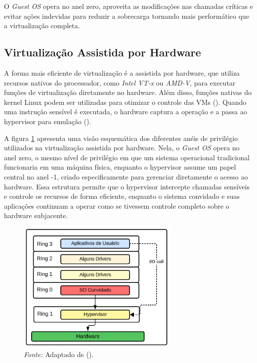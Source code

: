 O \textit{Guest OS} opera no anel zero, aproveita as modificações nas chamadas críticas e evitar ações indevidas para reduzir a sobrecarga tornando mais performático que a virtualização completa.

\subsection{Virtualização Assistida por Hardware}

A forma mais eficiente de virtualização é a assistida por hardware, que utiliza recursos nativos do processador, como \textit{Intel VT-x} ou \textit{AMD-V}, para executar funções de virtualização diretamente no hardware. Além disso, funções nativas do kernel Linux podem ser utilizadas para otimizar o controle das VMs (\cite{chirammal2016mastering}). Quando uma instrução sensível é executada, o hardware captura a operação e a passa ao hypervisor para emulação (\cite{modernOS}).

A figura \ref{fig:hardware_assisted_rings} apresenta uma visão esquemática dos diferentes anéis de privilégio utilizados na virtualização assistida por hardware. Nela, o \textit{Guest OS} opera no anel zero, o mesmo nível de privilégio em que um sistema operacional tradicional funcionaria em uma máquina física, enquanto o hypervisor assume um papel central no anel -1, criado especificamente para gerenciar diretamente o acesso ao hardware. Essa estrutura permite que o hypervisor intercepte chamadas sensíveis e controle os recursos de forma eficiente, enquanto o sistema convidado e suas aplicações continuam a operar como se tivessem controle completo sobre o hardware subjacente.

\begin{figure}[htbp]
  \centering
  \caption{Virtualização assistida por hardware nos anéis de segurança. A figura mostra o \textit{Guest OS} operando no anel 0 e o hypervisor no anel -1, permitindo um gerenciamento eficiente do hardware e reduzindo a necessidade de emulação por software.}
  \includegraphics[width=0.7\textwidth]{images/hardware_assisted_rings.png}
  \caption*{\textit{Fonte:} Adaptado de (\cite{chirammal2016mastering}).}
  \label{fig:hardware_assisted_rings}
\end{figure}

